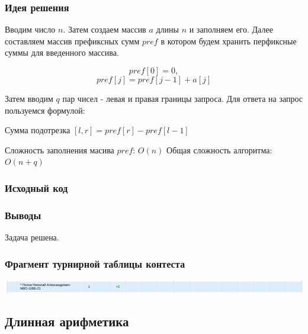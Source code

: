 \subsubsection*{Идея решения}

Вводим число $n$. Затем создаем массив $a$ длины $n$ и заполняем
его.
Далее составляем массив префиксных сумм $pref$ в котором будем хранить перфиксные суммы для введенного массива.

$$pref[0] = 0,$$
$$pref[j] = pref[j - 1] + a[j]$$

Затем вводим $q$ пар чисел - левая и правая границы запроса.
Для ответа на запрос пользуемся формулой:

\begin{center}
Сумма подотрезка $[l, r] = pref[r] - pref[l - 1]$
\end{center}

Сложность заполнения масива $pref$: $O(n)$ \newline
Общая сложность алгоритма: $O(n + q)$

\subsubsection*{Исходный код}


\subsubsection*{Выводы}
Задача решена.
\newline

\subsubsection*{Фрагмент турнирной таблицы контеста}
\begin{center}
\includegraphics[width=\textwidth]{standings/Contest4.png}\newline\noindent
\end{center}


\subsection*{Длинная арифметика}

